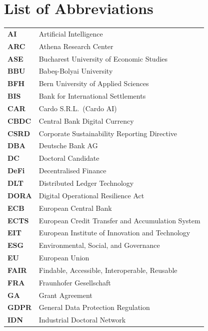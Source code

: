 \chapter*{List of Abbreviations}

\begin{longtable}{@{} >{\bfseries\sffamily}l @{\hspace{12mm}} l @{}}
  AI    & Artificial Intelligence \\[3pt]
  ARC   & Athena Research Center \\[3pt]
  ASE   & Bucharest University of Economic Studies \\[3pt]
  BBU   & Babe\c{s}-Bolyai University \\[3pt]
  BFH   & Bern University of Applied Sciences \\[3pt]
  BIS   & Bank for International Settlements \\[3pt]
  CAR   & Cardo S.R.L.\ (Cardo AI) \\[3pt]
  CBDC  & Central Bank Digital Currency \\[3pt]
  CSRD  & Corporate Sustainability Reporting Directive \\[3pt]
  DBA   & Deutsche Bank AG \\[3pt]
  DC    & Doctoral Candidate \\[3pt]
  DeFi  & Decentralised Finance \\[3pt]
  DLT   & Distributed Ledger Technology \\[3pt]
  DORA  & Digital Operational Resilience Act \\[3pt]
  ECB   & European Central Bank \\[3pt]
  ECTS  & European Credit Transfer and Accumulation System \\[3pt]
  EIT   & European Institute of Innovation and Technology \\[3pt]
  ESG   & Environmental, Social, and Governance \\[3pt]
  EU    & European Union \\[3pt]
  FAIR  & Findable, Accessible, Interoperable, Reusable \\[3pt]
  FRA   & Fraunhofer Gesellschaft \\[3pt]
  GA    & Grant Agreement \\[3pt]
  GDPR  & General Data Protection Regulation \\[3pt]
  IDN   & Industrial Doctoral Network \\[3pt]

\end{longtable}
